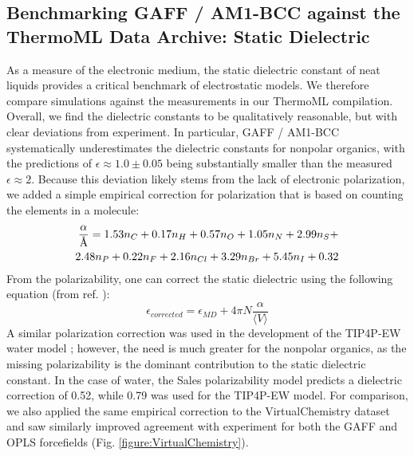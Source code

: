\documentclass[aps,pre,twocolumn,nofootinbib,superscriptaddress,linenumbers]{revtex4-1}
\begin{document}

\subsection{Benchmarking GAFF / AM1-BCC against the ThermoML Data Archive: Static Dielectric}

As a measure of the electronic medium, the static dielectric constant of neat liquids provides a critical benchmark of electrostatic models.  
We therefore compare simulations against the measurements in our ThermoML compilation.  
Overall, we find the dielectric constants to be qualitatively reasonable, but with clear deviations from experiment.  
In particular, GAFF / AM1-BCC systematically underestimates the dielectric constants for nonpolar organics, with the predictions of $\epsilon \approx 1.0 \pm 0.05$ being substantially smaller than the measured $\epsilon \approx 2$.  
Because this deviation likely stems from the lack of electronic polarization, we added a simple empirical correction for polarization \cite{bosque2002polarizabilities} that is based on counting the elements in a molecule:
\begin{equation} \label{eq:sales}
\begin{split}
\frac{\alpha}{\textnormal{\AA}} = 1.53 n_C + 0.17 n_H + 0.57 n_O + 1.05 n_N + 2.99 n_S + \\ 2.48 n_P + 0.22 n_F + 2.16 n_{Cl} + 3.29 n_{Br} + 5.45 n_I + 0.32 
\end{split}
\end{equation}
From the polarizability, one can correct the static dielectric using the following equation (from ref. \cite{horn2004}):
$$\epsilon_{corrected} = \epsilon_{MD} + 4 \pi N  \frac{\alpha}{\langle V \rangle}$$
A similar polarization correction was used in the development of the TIP4P-EW water model \cite{horn2004}; however, the need is much greater for the nonpolar organics, as the missing polarizability is the dominant contribution to the static dielectric constant.  
In the case of water, the Sales polarizability model predicts a dielectric correction of 0.52, while 0.79 was used for the TIP4P-EW model.  
For comparison, we also applied the same empirical correction to the VirtualChemistry dataset \cite{caleman2011force, van2012gromacs} and saw similarly improved agreement with experiment for both the GAFF and OPLS forcefields (Fig. \ref{figure:VirtualChemistry}).
\end{document}
